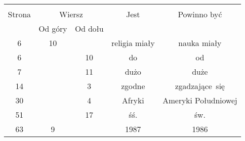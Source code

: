 \documentclass[a4paper,11pt]{article}
\begin{document}


\begin{center}

  \begin{tabular}{|c|c|c|c|c|}
    \hline
    & \multicolumn{2}{c|}{} & & \\
    Strona & \multicolumn{2}{c|}{Wiersz} & Jest
                              & Powinno być \\ \cline{2-3}
    & Od góry & Od dołu & & \\
    \hline
    6  & 10 & & religia miały & nauka miały \\
    6  & & 10 & do & od \\
    7  & & 11 & dużo & duże \\
    14 & &  3 & zgodne & zgadzające~się \\
    30 & &  4 & Afryki & Ameryki Południowej \\
    51 & & 17 & śś. & św. \\
    63 &  9 & & 1987 & 1986 \\
    \hline
  \end{tabular}

\end{center}

\vspace{\spaceTwo}






























 {}



\end{document}
